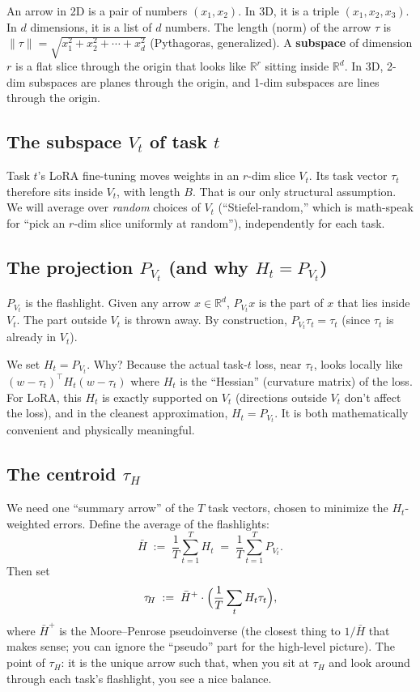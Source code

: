 \documentclass[11pt]{article}
\newcommand{\R}{\mathbb{R}}
\newcommand{\tauH}{\tau_{\!H}}
\newcommand{\Hbar}{\bar H}
\begin{document}
An arrow in 2D is a pair of numbers $(x_1, x_2)$. In 3D, it is a
triple $(x_1, x_2, x_3)$. In $d$ dimensions, it is a list of $d$
numbers. The length (norm) of the arrow $\tau$ is
$\|\tau\| = \sqrt{x_1^2 + x_2^2 + \cdots + x_d^2}$
(Pythagoras, generalized). A \textbf{subspace} of dimension $r$ is a
flat slice through the origin that looks like $\R^r$ sitting inside
$\R^d$. In 3D, 2-dim subspaces are planes through the origin, and
1-dim subspaces are lines through the origin.

\subsection{The subspace $V_t$ of task $t$}

Task $t$'s LoRA fine-tuning moves weights in an $r$-dim slice $V_t$.
Its task vector $\tau_t$ therefore sits inside $V_t$, with length $B$.
That is our only structural assumption. We will average over
\emph{random} choices of $V_t$ (``Stiefel-random,'' which is math-speak
for ``pick an $r$-dim slice uniformly at random''), independently for
each task.

\subsection{The projection $P_{V_t}$ (and why $H_t = P_{V_t}$)}

$P_{V_t}$ is the flashlight. Given any arrow $x\in\R^d$, $P_{V_t}x$ is
the part of $x$ that lies inside $V_t$. The part outside $V_t$ is
thrown away. By construction, $P_{V_t}\tau_t = \tau_t$ (since $\tau_t$
is already in $V_t$).

We set $H_t = P_{V_t}$. Why? Because the actual task-$t$ loss, near
$\tau_t$, looks locally like $(w - \tau_t)^\top H_t (w - \tau_t)$ where
$H_t$ is the ``Hessian'' (curvature matrix) of the loss. For LoRA,
this $H_t$ is exactly supported on $V_t$ (directions outside $V_t$
don't affect the loss), and in the cleanest approximation,
$H_t = P_{V_t}$. It is both mathematically convenient and physically
meaningful.

\subsection{The centroid $\tauH$}

We need one ``summary arrow'' of the $T$ task vectors, chosen to
minimize the $H_t$-weighted errors. Define the average of the
flashlights:
\[
  \Hbar \;:=\; \frac{1}{T}\sum_{t=1}^T H_t
  \;=\; \frac{1}{T}\sum_{t=1}^T P_{V_t}.
\]
Then set
\[
  \tauH \;:=\; \Hbar^+\cdot\Bigl(\frac{1}{T}\sum_t H_t\tau_t\Bigr),
\]
where $\Hbar^+$ is the Moore--Penrose pseudoinverse (the closest
thing to $1/\Hbar$ that makes sense; you can ignore the ``pseudo'' part
for the high-level picture). The point of $\tauH$: it is the unique
arrow such that, when you sit at $\tauH$ and look around through each
task's flashlight, you see a nice balance.
\end{document}
